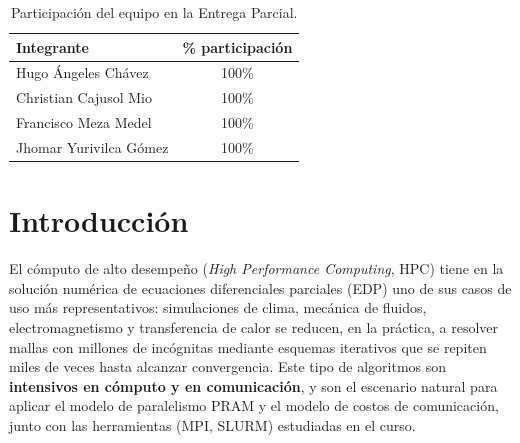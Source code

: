 \documentclass[11pt,a4paper]{article}
\begin{document}
	\begin{table}[H]
	\centering
	\begin{tabular}{lc}
		\toprule
		\textbf{Integrante} & \textbf{\% participación} \\
		\midrule
		Hugo Ángeles Chávez & 100\% \\
		\addlinespace
		Christian Cajusol Mio & 100\% \\
		\addlinespace
		Francisco Meza Medel & 100\% \\
		\addlinespace
		Jhomar Yurivilca Gómez & 100\% \\
		\bottomrule
	\end{tabular}
	\caption{Participación del equipo en la Entrega Parcial.}
	\label{tab:participacion}
	\end{table}

	\section{Introducción}

	El cómputo de alto desempeño (\textit{High Performance Computing}, HPC) tiene en
	la solución numérica de ecuaciones diferenciales parciales (EDP) uno de sus casos
	de uso más representativos: simulaciones de clima, mecánica de fluidos,
	electromagnetismo y transferencia de calor se reducen, en la práctica, a resolver
	mallas con millones de incógnitas mediante esquemas iterativos que se repiten
	miles de veces hasta alcanzar convergencia. Este tipo de algoritmos son
	\textbf{intensivos en cómputo y en comunicación}, y son el escenario natural para
	aplicar el modelo de paralelismo PRAM y el modelo de costos de comunicación,
	junto con las herramientas (MPI, SLURM) estudiadas en el curso.
\end{document}

